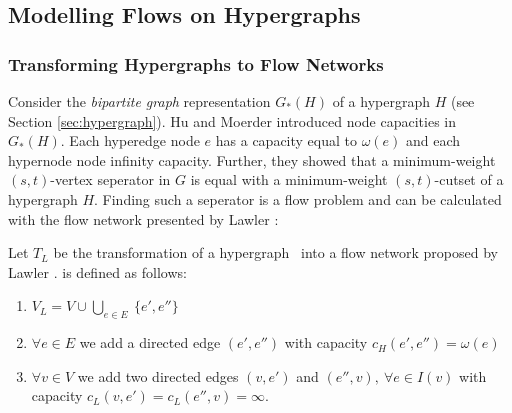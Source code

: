 
\subsection{Modelling Flows on Hypergraphs}
\label{sec:related_model_flow}


\subsubsection{Transforming Hypergraphs to Flow Networks}
\label{sec:related_lawler}

Consider the \emph{bipartite graph} representation $G_*(H)$ of a hypergraph $H$ (see Section \ref{sec:hypergraph}).
Hu and Moerder \cite{HuMoerder85} introduced node capacities in $G_*(H)$. Each hyperedge
node $e$ has a capacity equal to $\omega(e)$ and each hypernode node infinity capacity. 
Further, they showed that a minimum-weight $(s,t)$-vertex seperator in $G$
is equal with a minimum-weight $(s,t)$-cutset of a hypergraph $H$. 
Finding such a seperator is a flow problem and can be calculated with the flow network  
presented by Lawler \cite{lawler1973}:

\begin{definition}
Let $T_L$ be the transformation of a hypergraph \HypergraphDef~into 
a flow network  proposed by Lawler \cite{lawler1973}.  is defined as follows:
\begin{enumerate}
\item $V_L = V \cup \bigcup\limits_{e \in E}\ \{e', e''\}$
\item $\forall e \in E$ we add a directed edge $(e',e'')$ 
      with capacity $c_H(e',e'') = \omega(e)$
\item $\forall v \in V$ we add two directed edges $(v, e')$ and 
      $(e'', v),\ \forall e \in I(v)$ with 
      capacity $c_L(v, e') = c_L(e'',v) = \infty$.
\end{enumerate} 
\end{definition}

